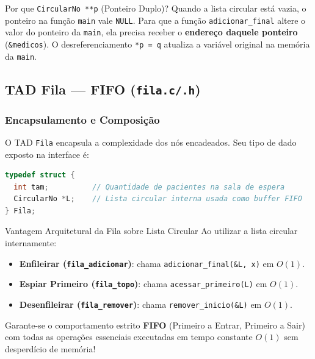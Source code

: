 \documentclass[11pt,a4paper]{article}
\begin{document}
\begin{destaquebox}{Por que \texttt{CircularNo **p} (Ponteiro Duplo)?}
Quando a lista circular está vazia, o ponteiro na função \texttt{main} vale \texttt{NULL}. Para que a função \texttt{adicionar\_final} altere o valor do ponteiro da \texttt{main}, ela precisa receber o \textbf{endereço daquele ponteiro} (\texttt{\&medicos}). O desreferenciamento \texttt{*p = q} atualiza a variável original na memória da \texttt{main}.
\end{destaquebox}

\newpage

\subsection{TAD Fila — FIFO (\texttt{fila.c/.h})}

\subsubsection{Encapsulamento e Composição}
O TAD \texttt{Fila} encapsula a complexidade dos nós encadeados. Seu tipo de dado exposto na interface é:
\begin{lstlisting}[language=C]
typedef struct {
  int tam;          // Quantidade de pacientes na sala de espera
  CircularNo *L;    // Lista circular interna usada como buffer FIFO
} Fila;
\end{lstlisting}

\begin{conceitobox}{Vantagem Arquitetural da Fila sobre Lista Circular}
Ao utilizar a lista circular internamente:
\begin{itemize}
    \item \textbf{Enfileirar (\texttt{fila\_adicionar})}: chama \texttt{adicionar\_final(\&L, x)} em $O(1)$.
    \item \textbf{Espiar Primeiro (\texttt{fila\_topo})}: chama \texttt{acessar\_primeiro(L)} em $O(1)$.
    \item \textbf{Desenfileirar (\texttt{fila\_remover})}: chama \texttt{remover\_inicio(\&L)} em $O(1)$.
\end{itemize}
Garante-se o comportamento estrito \textbf{FIFO} (Primeiro a Entrar, Primeiro a Sair) com todas as operações essenciais executadas em tempo constante $O(1)$ sem desperdício de memória!
\end{conceitobox}
\end{document}
